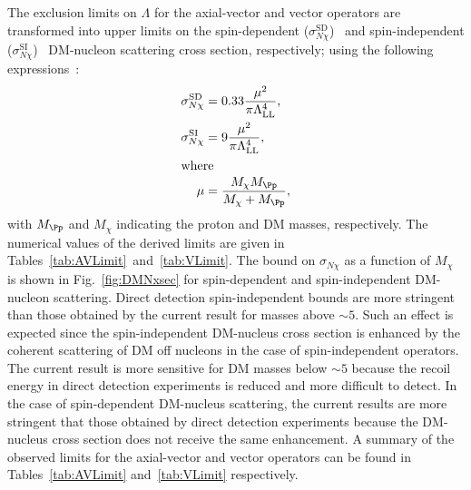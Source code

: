 The exclusion limits on $\Lambda$ for the axial-vector and vector operators are transformed into upper limits on
the spin-dependent ($\sigma^\mathrm{SD}_{N\chi}$)~\cite{Super-Kamiokande,
  IceCube, COUPP, SIMPLE, Amole:2015lsj, Archambault:2012pm, Aprile:2013doa} and spin-independent
($\sigma^\mathrm{SI}_{N\chi}$)~\cite{SIMPLE, COUPP, CDMS-II, SuperCDMS, XENON100, LUX, Angloher:2014myn, Angloher:2015ewa}
DM-nucleon scattering cross section, respectively; using the following
expressions~\cite{PhysRevD.85.056011}:
\begin{align}
\sigma_{N\chi}^\mathrm{SD}  & =  0.33 \frac{\mu^{2}}{\pi\Lambda_\mathrm{LL}^{4}}, \\
\sigma_{N\chi}^\mathrm{SI}  & =  9 \frac{\mu^2}{\pi\Lambda_\mathrm{LL}^{4}},\\
\intertext{where}
\mu &= \frac{M_{\chi}M_{\Pp}}{M_{\chi}+M_{\Pp}},
\end{align}
with $M_{\Pp}$ and $M_\chi$ indicating the proton and
DM masses, respectively. The numerical values of the derived limits
are given in Tables~\ref{tab:AVLimit}~and~\ref{tab:VLimit}.  The
bound on $\sigma_{N\chi}$ as a function of $M_\chi$ is shown
in Fig.~\ref{fig:DMNxsec} for spin-dependent and spin-independent
DM-nucleon scattering. Direct detection spin-independent bounds are more stringent than those obtained by
the current result for masses above $\sim 5$\GeV. Such an effect is expected since
the spin-independent DM-nucleus cross section is enhanced by the coherent
scattering of DM off nucleons in the case of spin-independent
operators. The current result is more sensitive for DM masses below $\sim 5$\GeV
because the recoil energy in direct detection experiments is reduced and 
more difficult to detect. In the case of spin-dependent
DM-nucleus scattering, the current results are more stringent that those 
obtained by direct detection experiments because the DM-nucleus cross section 
does not receive the same enhancement. A summary of the observed limits for the
axial-vector and vector operators can be found in
Tables~\ref{tab:AVLimit} and~\ref{tab:VLimit} respectively. 

